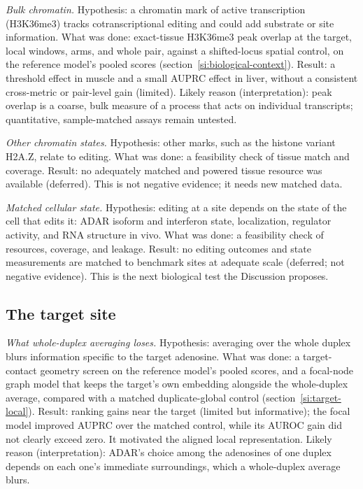 \documentclass[9pt,twoside]{pnas-new}
\begin{document}
\textit{Bulk chromatin.} Hypothesis: a chromatin mark of active transcription (H3K36me3) tracks cotranscriptional editing and could add substrate or site information. What was done: exact-tissue H3K36me3 peak overlap at the target, local windows, arms, and whole pair, against a shifted-locus spatial control, on the reference model's pooled scores (section~\ref{si:biological-context}). Result: a threshold effect in muscle and a small AUPRC effect in liver, without a consistent cross-metric or pair-level gain (limited). Likely reason (interpretation): peak overlap is a coarse, bulk measure of a process that acts on individual transcripts; quantitative, sample-matched assays remain untested.

\textit{Other chromatin states.} Hypothesis: other marks, such as the histone variant H2A.Z, relate to editing. What was done: a feasibility check of tissue match and coverage. Result: no adequately matched and powered tissue resource was available (deferred). This is not negative evidence; it needs new matched data.

\textit{Matched cellular state.} Hypothesis: editing at a site depends on the state of the cell that edits it: ADAR isoform and interferon state, localization, regulator activity, and RNA structure in vivo. What was done: a feasibility check of resources, coverage, and leakage. Result: no editing outcomes and state measurements are matched to benchmark sites at adequate scale (deferred; not negative evidence). This is the next biological test the Discussion proposes.

\subsection*{The target site}

\textit{What whole-duplex averaging loses.} Hypothesis: averaging over the whole duplex blurs information specific to the target adenosine. What was done: a target-contact geometry screen on the reference model's pooled scores, and a focal-node graph model that keeps the target's own embedding alongside the whole-duplex average, compared with a matched duplicate-global control (section~\ref{si:target-local}). Result: ranking gains near the target (limited but informative); the focal model improved AUPRC over the matched control, while its AUROC gain did not clearly exceed zero. It motivated the aligned local representation. Likely reason (interpretation): ADAR's choice among the adenosines of one duplex depends on each one's immediate surroundings, which a whole-duplex average blurs.
\end{document}
